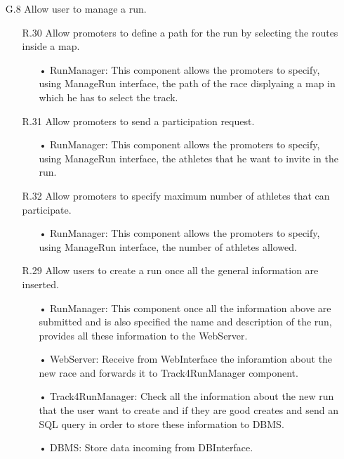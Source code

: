 \begin{enumerate}
\item [G.8] Allow user to manage a run.
	\begin{enumerate}
	\item [R.30] Allow promoters to define a path for the run by selecting the routes inside a map.
		\begin{enumerate}
		\item[•] RunManager: This component allows the promoters to specify, using ManageRun interface, the path of the race displyaing a map in which he has to select the track.
		\end{enumerate}	
	\item [R.31] Allow promoters to send a participation request.
		\begin{enumerate}
		\item[•] RunManager: This component allows the promoters to specify, using ManageRun interface, the athletes that he want to invite in the run.
		\end{enumerate}	
	\item [R.32] Allow promoters to specify maximum number of athletes that can participate.
		\begin{enumerate}
		\item[•] RunManager: This component allows the promoters to specify, using ManageRun interface, the number of athletes allowed.
		\end{enumerate}	
	\item [R.29] Allow users to create a run once all the general information are inserted.
		\begin{enumerate}
		\item[•] RunManager: This component once all the information above are submitted and is also specified the name and description of the run, provides all these information to the WebServer.
		\item[•] WebServer: Receive from WebInterface the inforamtion about the new race and forwards it to Track4RunManager component.
		\item[•] Track4RunManager: Check all the information about the new run that the user want to create and if they are good creates and send an SQL query in order to store these information to DBMS.
		\item[•] DBMS: Store data incoming from DBInterface.
		\end{enumerate}	
	\end{enumerate}	
	

\end{enumerate}
